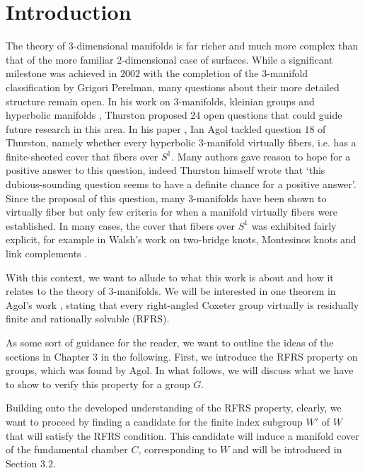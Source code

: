 \chapter{Introduction}\label{ch:introduction}

The theory of \(3\)-dimensional manifolds is far richer and much more complex than that of the more familiar \(2\)-dimensional case of surfaces.
While a significant milestone was achieved in \(2002\) with the completion of the \(3\)-manifold classification by Grigori Perelman, many questions about their more detailed structure remain open.
In his work on \(3\)-manifolds, kleinian groups and hyperbolic manifolds \cite{Thurston1982}, Thurston proposed \(24\) open questions that could guide future research in this area.
In his paper \cite{ian_criteria_2008}, Ian Agol tackled question \(18\) of Thurston, namely whether every hyperbolic \(3\)-manifold virtually fibers, i.e. has a finite-sheeted cover that fibers over \(S^1\).
Many authors gave reason to hope for a positive answer to this question, indeed Thurston himself wrote that `this dubious-sounding question seems to have a definite chance for a positive answer'.
Since the proposal of this question, many \(3\)-manifolds have been shown to virtually fiber but only few criteria for when a manifold virtually fibers were established.
In many cases, the cover that fibers over \(S^1\) was exhibited fairly explicit, for example in Walsh's work on two-bridge knots, Montesinos knots and link complements \cite{Walsh2004}.

With this context, we want to allude to what this work is about and how it relates to the theory of \(3\)-manifolds.
We will be interested in one theorem in Agol's work \cite[Criteria for virtual fibering]{ian_criteria_2008}, stating that every right-angled Coxeter group virtually is residually finite and rationally solvable (RFRS).

As some sort of guidance for the reader, we want to outline the ideas of the sections in Chapter 3 in the following.
First, we introduce the RFRS property on groups, which was found by Agol. %
In what follows, we will discuss what we have to show to verify this property for a group \(G\).

\noindent
Building onto the developed understanding of the RFRS property, clearly, we want to proceed by finding a candidate for the finite index subgroup \(W'\) of \(W\) that will satisfy the RFRS condition.
This candidate will induce a manifold cover of the fundamental chamber \(C\), corresponding to \(W\) and will be introduced in Section \(3.2\).

